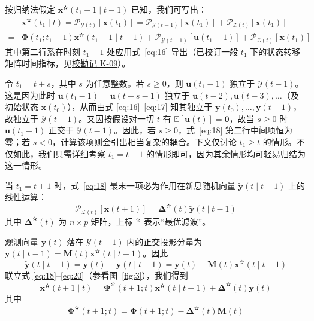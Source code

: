 按归纳法假定 $\bm{x}^{\text{✫}}(t_1 - 1 \mid t - 1)$ 已知，我们可写出：
\begin{equation}\label{eq:18}
\begin{aligned}
&\bm{x}^{\text{✫}}(t_1 \mid t) = \mathscr{P}_{\mathcal{Y}(t)}[\bm{x}(t_1)] = \mathscr{P}_{\mathcal{Y}(t - 1)}[\bm{x}(t_1)] + \mathscr{P}_{\mathcal{Z}(t)}[\bm{x}(t_1)] \\
= &\bm{\Phi}(t_1; t_1 - 1)\bm{x}^{\text{✫}}(t_1 - 1 \mid t - 1) + \mathscr{P}_{\mathcal{Y}(t - 1)}[\bm{u}(t_1 - 1)] + \mathscr{P}_{\mathcal{Z}(t)}[\bm{x}(t_1)]
\end{aligned}
\end{equation}
其中第二行系在时刻 $t_1 - 1$ 处应用式~\eqref{eq:16} 导出（已校订一般 $t_1$ 下的状态转移矩阵时间指标，见\hyperref[sec:k09]{校勘记 K-09}）。

令 $t_1 = t + s$，其中 $s$ 为任意整数。若 $s \geq 0$，则 $\bm{u}(t_1 - 1)$ 独立于 $\mathcal{Y}(t - 1)$。这是因为此时 $\bm{u}(t_1 - 1) = \bm{u}(t + s - 1)$ 独立于 $\bm{u}(t - 2), \bm{u}(t - 3), \dots$（及初始状态 $\bm{x}(t_0)$），从而由式 \eqref{eq:16}–\eqref{eq:17} 知其独立于 $\bm{y}(t_0), \dots, \bm{y}(t - 1)$，故独立于 $\mathcal{Y}(t - 1)$。又因按假设对一切 $t$ 有 $\mathbb{E}[\bm{u}(t)] = \bm{0}$，故当 $s \geq 0$ 时 $\bm{u}(t_1 - 1)$ 正交于 $\mathcal{Y}(t - 1)$。因此，若 $s \geq 0$，式~\eqref{eq:18} 第二行中间项恒为零；若 $s < 0$，计算该项则会引出相当复杂的耦合。下文仅讨论 $t_1 \geq t$ 的情形。不仅如此，我们只需详细考察 $t_1 = t + 1$ 的情形即可，因为其余情形均可轻易归结为这一情形。

当 $t_1 = t + 1$ 时，式~\eqref{eq:18} 最末一项必为作用在新息随机向量 $\tilde{\bm{y}}(t \mid t - 1)$ 上的线性运算：
\begin{equation}\label{eq:19}
\mathscr{P}_{\mathcal{Z}(t)}[\bm{x}(t + 1)] = \bm{\Delta}^{\text{✫}}(t)\tilde{\bm{y}}(t \mid t - 1)
\end{equation}
其中 $\bm{\Delta}^{\text{✫}}(t)$ 为 $n \times p$ 矩阵，上标 ${}^{\text{✫}}$ 表示“最优滤波”。

观测向量 $\bm{y}(t)$ 落在 $\mathcal{Y}(t - 1)$ 内的正交投影分量为 $\bar{\bm{y}}(t \mid t - 1) = \bm{M}(t)\bm{x}^{\text{✫}}(t \mid t - 1)$。因此
\begin{equation}\label{eq:20}
\tilde{\bm{y}}(t \mid t - 1) = \bm{y}(t) - \bar{\bm{y}}(t \mid t - 1) = \bm{y}(t) - \bm{M}(t)\bm{x}^{\text{✫}}(t \mid t - 1)
\end{equation}
联立式 \eqref{eq:18}–\eqref{eq:20}（参看图~\ref{fig:3}），我们得到
\begin{equation}\label{eq:21}
\bm{x}^{\text{✫}}(t + 1 \mid t) = \bm{\Phi}^{\text{✫}}(t + 1; t)\bm{x}^{\text{✫}}(t \mid t - 1) + \bm{\Delta}^{\text{✫}}(t)\bm{y}(t)
\end{equation}
其中
\begin{equation}\label{eq:22}
\bm{\Phi}^{\text{✫}}(t + 1; t) = \bm{\Phi}(t + 1; t) - \bm{\Delta}^{\text{✫}}(t)\bm{M}(t)
\end{equation}

